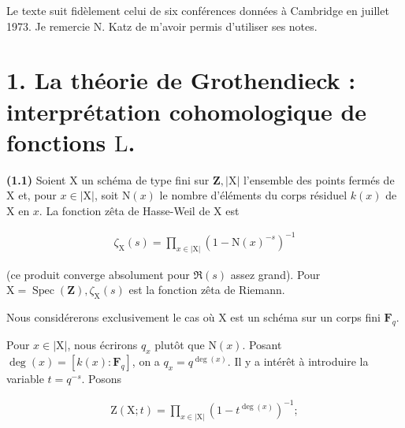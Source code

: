 \documentclass[10pt,leqno]{article}
\begin{document}
\noindent Le texte suit fidèlement celui de six conférences données à Cambridge en juillet 1973. Je remercie \(\mathrm{N}\). Katz de m’avoir permis d’utiliser ses notes.\par

\section*{1. La théorie de Grothendieck : interprétation cohomologique de fonctions \(\mathrm{L}\).}

\noindent \textbf{(1.1)} Soient \(\mathrm{X}\) un schéma de type fini sur \(\mathbf{Z}, |\mathrm{X}|\) l’ensemble des points fermés de \(\mathrm{X}\) et, pour \(x\in |\mathrm{X}|\), soit \(\mathrm{N}(x)\) le nombre d’éléments du corps résiduel \(k(x)\) de \(\mathrm{X}\) en \(x\). La fonction zêta de Hasse-Weil de \(\mathrm{X}\) est\par

\begin{equation*}\begin{gathered}\zeta _{\mathrm{X}}(s) = \prod _{x\in |\mathrm{X}|} (1 -  \mathrm{N}(x)^{- s})^{- 1}\end{gathered}\tag{1.1.1}\end{equation*}

\noindent (ce produit converge absolument pour \(\Re (s)\) assez grand). Pour \(\mathrm{X} = \operatorname{Spec}(\mathbf{Z}), \zeta _{\mathrm{X}}(s)\) est la fonction zêta de Riemann.\par

\noindent Nous considérerons exclusivement le cas où \(\mathrm{X}\) est un schéma sur un corps fini \(\mathbf{F}_{q}\).\par

\clearpage

\label{physical-3}\par\smallskip

\noindent Pour \(x\in |\mathrm{X}|\), nous écrirons \(q_{x}\) plutôt que \(\mathrm{N}(x)\). Posant \(\operatorname{deg}(x)=[k(x):\mathbf{F}_{q}]\), on a \(q_{x}=q^{\operatorname{deg}(x)}\). Il y a intérêt à introduire la variable \(t=q^{- s}\). Posons\par

\begin{equation*}\begin{gathered}\mathrm{Z}(\mathrm{X}; t) = \prod _{x\in |\mathrm{X}|} (1 -  t^{\operatorname{deg}(x)})^{- 1} ;\end{gathered}\tag{1.1.2}\end{equation*}
\end{document}
